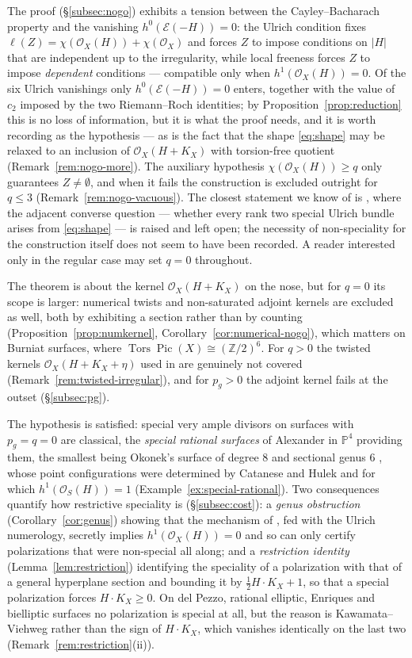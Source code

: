 \documentclass{amsart}
\theoremstyle{definition}
\newcommand{\OO}{\mathcal{O}}
\newcommand{\EE}{\mathcal{E}}
\newcommand{\PP}{\mathbb{P}}
\newcommand{\ZZ}{\mathbb{Z}}
\newcommand{\Pic}{\operatorname{Pic}}
\newcommand{\len}{\ell}
\begin{document}
The proof (\S\ref{subsec:nogo}) exhibits a tension between the Cayley--Bacharach property and the vanishing $h^0(\EE(-H))=0$: the Ulrich condition fixes $\len(Z)=\chi(\OO_X(H))+\chi(\OO_X)$ and forces $Z$ to impose conditions on $|H|$ that are independent up to the irregularity, while local freeness forces $Z$ to impose \emph{dependent} conditions --- compatible only when $h^1(\OO_X(H))=0$. Of the six Ulrich vanishings only $h^0(\EE(-H))=0$ enters, together with the value of $c_2$ imposed by the two Riemann--Roch identities; by Proposition~\ref{prop:reduction} this is no loss of information, but it is what the proof needs, and it is worth recording as the hypothesis --- as is the fact that the shape \eqref{eq:shape} may be relaxed to an inclusion of $\OO_X(H+K_X)$ with torsion-free quotient (Remark~\ref{rem:nogo-more}). The auxiliary hypothesis $\chi(\OO_X(H))\ge q$ only guarantees $Z\neq\emptyset$, and when it fails the construction is excluded outright for $q\le3$ (Remark~\ref{rem:nogo-vacuous}). The closest statement we know of is \cite[Rem.~3.4]{Cas17}, where the adjacent converse question --- whether every rank two special Ulrich bundle arises from \eqref{eq:shape} --- is raised and left open; the necessity of non-speciality for the construction itself does not seem to have been recorded. A reader interested only in the regular case may set $q=0$ throughout.

The theorem is about the kernel $\OO_X(H+K_X)$ on the nose, but for $q=0$ its scope is larger: numerical twists and non-saturated adjoint kernels are excluded as well, both by exhibiting a section rather than by counting (Proposition~\ref{prop:numkernel}, Corollary~\ref{cor:numerical-nogo}), which matters on Burniat surfaces, where $\operatorname{Tors}\Pic(X)\cong(\ZZ/2)^6$. For $q>0$ the twisted kernels $\OO_X(H+K_X+\eta)$ used in \cite{Cas19} are genuinely not covered (Remark~\ref{rem:twisted-irregular}), and for $p_g>0$ the adjoint kernel fails at the outset (\S\ref{subsec:pg}).

The hypothesis is satisfied: special very ample divisors on surfaces with $p_g=q=0$ are classical, the \emph{special rational surfaces} of Alexander in $\PP^4$ \cite{Al88,Al92} providing them, the smallest being Okonek's surface of degree $8$ and sectional genus $6$ \cite{Ok86}, whose point configurations were determined by Catanese and Hulek \cite{CH97} and for which $h^1(\OO_S(H))=1$ (Example~\ref{ex:special-rational}). Two consequences quantify how restrictive speciality is (\S\ref{subsec:cost}): a \emph{genus obstruction} (Corollary~\ref{cor:genus}) showing that the mechanism of \cite{An94}, fed with the Ulrich numerology, secretly implies $h^1(\OO_X(H))=0$ and so can only certify polarizations that were non-special all along; and a \emph{restriction identity} (Lemma~\ref{lem:restriction}) identifying the speciality of a polarization with that of a general hyperplane section and bounding it by $\tfrac12H\cdot K_X+1$, so that a special polarization forces $H\cdot K_X\ge0$. On del Pezzo, rational elliptic, Enriques and bielliptic surfaces no polarization is special at all, but the reason is Kawamata--Viehweg rather than the sign of $H\cdot K_X$, which vanishes identically on the last two (Remark~\ref{rem:restriction}(ii)).
\end{document}
